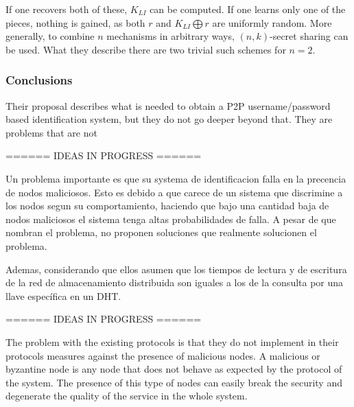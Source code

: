   If one recovers both of these, $K_{LI}$ can be computed. If one learns only one
 of the pieces, nothing is gained, as both $r$ and $K_{LI} \bigoplus r$ are
 uniformly random. More generally, to combine $n$ mechanisms
  in arbitrary ways, $(n, k)$-secret sharing can be used. What they
 describe there are two trivial such schemes for $n = 2$.\\





\subsubsection{Conclusions}

Their proposal describes what is needed to obtain a P2P username/password based
identification system, but they do not go deeper beyond that. They are problems
that are not 

====== IDEAS IN PROGRESS ======

Un problema importante es que su systema de identificacion falla en la
precencia de nodos maliciosos. Esto es debido a que carece de un sistema que
discrimine a los nodos segun su comportamiento, haciendo que bajo una cantidad
baja de nodos maliciosos el sistema tenga altas probabilidades de falla. A
pesar de que nombran el problema, no proponen soluciones que realmente
solucionen el problema.

Ademas, considerando que ellos asumen que los tiempos de lectura y de escritura
de la red de almacenamiento distribuida son iguales a los de la consulta por
una llave específica en un DHT.

====== IDEAS IN PROGRESS ======

The problem with the existing protocols is that they do not implement in their
protocols measures against the presence of malicious nodes.
A malicious or byzantine node is any node that does
not behave as expected by the protocol of the system. The presence of this type
of nodes can easily break the security and degenerate the quality of the
service in the whole system.

